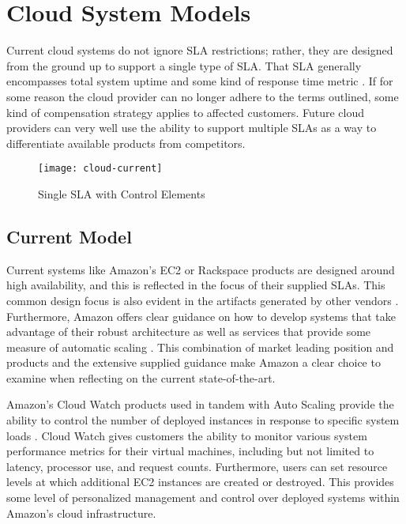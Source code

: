 \section{Cloud System Models}\label{sec:cloud-models}
Current cloud systems do not ignore SLA restrictions; rather, they are designed from the ground up to support a single type of SLA.  That SLA generally encompasses total system uptime and some kind of response time metric \cite{ctrl:amazon-sla,ctrl:rackspace-sla}.  If for some reason the cloud provider can no longer adhere to the terms outlined, some kind of compensation strategy applies to affected customers.  Future cloud providers can very well use the ability to support multiple SLAs as a way to differentiate available products from competitors.

\begin{figure}[!t]
\centering
\texttt{[image: cloud-current]}
\caption{Single SLA with Control Elements}
\label{fig:current-cloud-model}
\end{figure}

\subsection{Current Model}
Current systems like Amazon's EC2 or Rackspace products are designed around high availability, and this is reflected in the focus of their supplied SLAs.  This common design focus is also evident in the artifacts generated by other vendors \cite{ctrl:google-arch}.  Furthermore, Amazon offers clear guidance on how to develop systems that take advantage of their robust architecture as well as services that provide some measure of automatic scaling \cite{ctrl:amazon-best-practice,ctrl:amazon-fault-tolerant}.  This combination of market leading position and products and the extensive supplied guidance make Amazon a clear choice to examine when reflecting on the current state-of-the-art.

Amazon's Cloud Watch products used in tandem with Auto Scaling provide the ability to control the number of deployed instances in response to specific system loads \cite{ctrl:amazon-cloud-watch,ctrl:amazon-auto-scale}.  Cloud Watch gives customers the ability to monitor various system performance metrics for their virtual machines, including but not limited to latency, processor use, and request counts.  Furthermore, users can set resource levels at which additional EC2 instances are created or destroyed.  This provides some level of personalized management and control over deployed systems within Amazon's cloud infrastructure.

